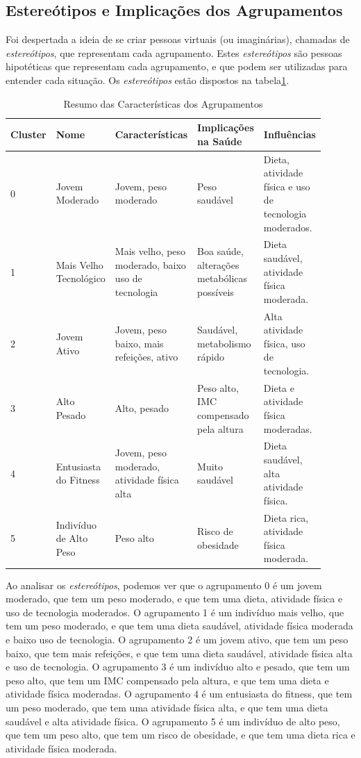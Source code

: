 \documentclass{easychair}
\begin{document}
\subsection{Estereótipos e Implicações dos Agrupamentos}

Foi despertada a ideia de se criar pessoas virtuais (ou imaginárias), chamadas de \textit{estereótipos}, que representam cada agrupamento. Estes \textit{estereótipos} são pessoas hipotéticas que representam cada agrupamento, e que podem ser utilizadas para entender cada situação. Os \textit{estereótipos} estão dispostos na tabela\ref{tab:stereotypes}.

\begin{table}[hbt!]
  \centering
  \begin{tabular}{p{0.1\linewidth} p{0.2\linewidth} p{0.2\linewidth} p{0.2\linewidth} p{0.2\linewidth}}
  \toprule
  Cluster & Nome & Características & Implicações na Saúde & Influências \\
  \midrule
  0 & Jovem Moderado & Jovem, peso moderado & Peso saudável & Dieta, atividade física e uso de tecnologia moderados. \\
  1 & Mais Velho Tecnológico & Mais velho, peso moderado, baixo uso de tecnologia & Boa saúde, alterações metabólicas possíveis & Dieta saudável, atividade física moderada. \\
  2 & Jovem Ativo & Jovem, peso baixo, mais refeições, ativo & Saudável, metabolismo rápido & Alta atividade física, uso de tecnologia. \\
  3 & Alto Pesado & Alto, pesado & Peso alto, IMC compensado pela altura & Dieta e atividade física moderadas. \\
  4 & Entusiasta do Fitness & Jovem, peso moderado, atividade física alta & Muito saudável & Dieta saudável, alta atividade física. \\
  5 & Indivíduo de Alto Peso & Peso alto & Risco de obesidade & Dieta rica, atividade física moderada. \\
  \bottomrule
  \end{tabular}
  \caption{Resumo das Características dos Agrupamentos}
  \label{tab:stereotypes}
\end{table}

Ao analisar os \textit{estereótipos}, podemos ver que o agrupamento 0 é um jovem moderado, que tem um peso moderado, e que tem uma dieta, atividade física e uso de tecnologia moderados. O agrupamento 1 é um indivíduo mais velho, que tem um peso moderado, e que tem uma dieta saudável, atividade física moderada e baixo uso de tecnologia. O agrupamento 2 é um jovem ativo, que tem um peso baixo, que tem mais refeições, e que tem uma dieta saudável, atividade física alta e uso de tecnologia. O agrupamento 3 é um indivíduo alto e pesado, que tem um peso alto, que tem um IMC compensado pela altura, e que tem uma dieta e atividade física moderadas. O agrupamento 4 é um entusiasta do fitness, que tem um peso moderado, que tem uma atividade física alta, e que tem uma dieta saudável e alta atividade física. O agrupamento 5 é um indivíduo de alto peso, que tem um peso alto, que tem um risco de obesidade, e que tem uma dieta rica e atividade física moderada.
\end{document}
